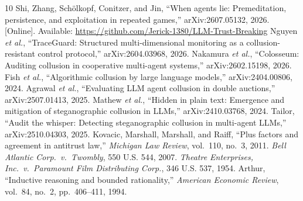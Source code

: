 \documentclass[conference]{IEEEtran}
\begin{document}
\begin{thebibliography}{10}
 Shi, Zhang, Sch\"olkopf, Conitzer, and Jin, ``When agents lie: Premeditation, persistence, and
exploitation in repeated games,'' arXiv:2607.05132, 2026. [Online]. Available:
\url{https://github.com/Jerick-1380/LLM-Trust-Breaking}
 Nguyen \textit{et al.}, ``TraceGuard: Structured multi-dimensional monitoring as a
collusion-resistant control protocol,'' arXiv:2604.03968, 2026.
 Nakamura \textit{et al.}, ``Colosseum: Auditing collusion in cooperative multi-agent systems,''
arXiv:2602.15198, 2026.
 Fish \textit{et al.}, ``Algorithmic collusion by large language models,'' arXiv:2404.00806, 2024.
 Agrawal \textit{et al.}, ``Evaluating LLM agent collusion in double auctions,'' arXiv:2507.01413,
2025.
 Mathew \textit{et al.}, ``Hidden in plain text: Emergence and mitigation of steganographic collusion
in LLMs,'' arXiv:2410.03768, 2024.
 Tailor, ``Audit the whisper: Detecting steganographic collusion in multi-agent LLMs,''
arXiv:2510.04303, 2025.
 Kovacic, Marshall, Marshall, and Raiff, ``Plus factors and agreement in antitrust law,''
\textit{Michigan Law Review}, vol.~110, no.~3, 2011.
 \textit{Bell Atlantic Corp.\ v.\ Twombly}, 550 U.S. 544, 2007.
 \textit{Theatre Enterprises, Inc.\ v.\ Paramount Film Distributing Corp.}, 346 U.S. 537, 1954.
 Arthur, ``Inductive reasoning and bounded rationality,'' \textit{American Economic Review},
vol.~84, no.~2, pp.~406--411, 1994.
\end{thebibliography}

\appendices
\end{document}
